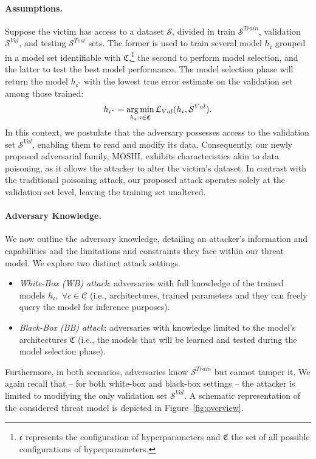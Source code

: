 \paragraph{Assumptions.}
Suppose the victim has access to a dataset $\mathcal{S}$, divided in train $\mathcal{S}^{Train}$, validation $\mathcal{S}^{Val}$, and testing $\mathcal{S}^{Test}$ sets.
The former is used to train several model $h_{\mathfrak{c}}$ grouped in a model set identifiable with $\mathfrak{C}$,\footnote{$\mathfrak{c}$ represents the configuration of hyperparameters and $\mathfrak{C}$ the set of all possible configurations of hyperparameters.} the second to perform model selection, and the latter to test the best model performance.
The model selection phase will return the model $h_{\mathfrak{c}^*}$ with the lowest true error estimate on the validation set among those trained:
    \begin{equation}
        \label{best_val}
 h_{\mathfrak{c}^*} = \operatorname*{arg\,min}_{h_{\mathfrak{c}} : \mathfrak{c} \in \mathfrak{C}} \mathcal{L}_{Val}(h_{\mathfrak{c}}, \mathcal{S}^{Val}).
    \end{equation}
In this context, we postulate that the adversary possesses access to the validation set $\mathcal{S}^{Val}$, enabling them to read and modify its data.
Consequently, our newly proposed adversarial family, MOSHI, exhibits characteristics akin to data poisoning, as it allows the attacker to alter the victim’s dataset.
In contrast with the traditional poisoning attack, our proposed attack operates solely at the validation set level, leaving the training set unaltered.

\paragraph{Adversary Knowledge.}
We now outline the adversary knowledge, detailing an attacker's information and capabilities and the limitations and constraints they face within our threat model.
We explore two distinct attack settings.
\begin{itemize}
    \item \textit{White-Box (WB) attack}: adversaries with full knowledge of the trained models $h_{\mathfrak{c}}, \;  \forall c \in \mathcal{C}$ (i.e., architectures, trained parameters and they can freely query the model for inference purposes). 
    \item \textit{Black-Box (BB) attack}: adversaries with knowledge limited to the model's architectures $\mathfrak{C}$ (i.e., the models that will be learned and tested during the model selection phase). 
\end{itemize}
Furthermore, in both scenarios, adversaries know $\mathcal{S}^{Train}$ but cannot tamper it. 
We again recall that -- for both white-box and black-box settings -- the attacker is limited to modifying the only validation set $\mathcal{S}^{Val}$.
A schematic representation of the considered threat model is depicted in Figure~\ref{fig:overview}.

